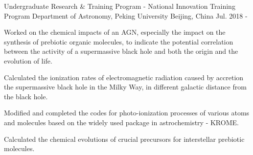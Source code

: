 


\begin{cventries}


\cventry
{Undergraduate Research \& Training Program - National Innovation Training Program} %
{Department of Astronomy, Peking University} %
{Beijing, China} %
{Jul. 2018 - } %
{ %
\begin{cvitems}
\item {Worked on the chemical impacts of an AGN, especially the impact on the synthesis of prebiotic organic molecules, to indicate the potential correlation between the activity of a supermassive black hole and both the origin and the evolution of life.}
\item {Calculated the ionization rates of electromagnetic radiation caused by accretion the supermassive black hole in the Milky Way, in different galactic distance from the black hole.}
\item {Modified and completed the codes for photo-ionization processes of various atoms and molecules based on the widely used package in astrochemistry - KROME.}
\item {Calculated the chemical evolutions of crucial precursors for interstellar prebiotic molecules.}
\end{cvitems}
}

\end{cventries}
